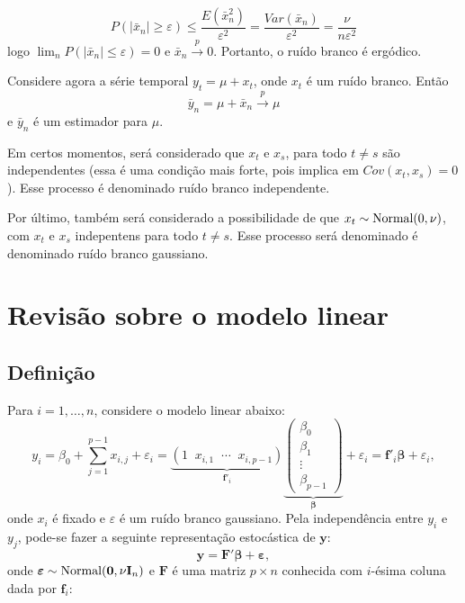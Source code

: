 \documentclass[
  letterpaper,
  DIV=11,
  numbers=noendperiod]{scrreprt}
\theoremstyle{definition}
\theoremstyle{plain}
\theoremstyle{definition}
\theoremstyle{plain}
\theoremstyle{remark}
\begin{document}
\[P\left(|\bar{x}_n|\geq\varepsilon\right)\leq \frac{E(\bar{x}_n^2)}{\varepsilon^2}=\frac{Var(\bar{x}_n)}{\varepsilon^2}=\frac{\nu}{n\varepsilon^2}\]
logo \(\lim_{n}P(|\bar{x}_n|\leq \varepsilon)=0\) e
\(\bar{x}_n\stackrel{p}{\rightarrow}0\). Portanto, o ruído branco é
ergódico.

Considere agora a série temporal \(y_t=\mu+x_t\), onde \(x_t\) é um
ruído branco. Então
\[\bar{y}_n=\mu+\bar{x}_n\stackrel{p}{\rightarrow}\mu\] e \(\bar{y}_n\)
é um estimador para \(\mu\).

Em certos momentos, será considerado que \(x_t\) e \(x_s\), para todo
\(t\neq s\) são independentes (essa é uma condição mais forte, pois
implica em \(Cov(x_t,x_s)=0\)). Esse processo é denominado ruído branco
independente.

Por último, também será considerado a possibilidade de que
\(x_t\sim\hbox{Normal}(0,\nu)\), com \(x_t\) e \(x_s\) indepentens para
todo \(t\neq s\). Esse processo será denominado é denominado ruído
branco gaussiano.


\hypertarget{revisuxe3o-sobre-o-modelo-linear}{%
\chapter{Revisão sobre o modelo
linear}\label{revisuxe3o-sobre-o-modelo-linear}}

\hypertarget{definiuxe7uxe3o}{%
\section{Definição}\label{definiuxe7uxe3o}}

Para \(i=1,\ldots,n\), considere o modelo linear abaixo:
\[y_i= \beta_0+\sum_{j=1}^{p-1}x_{i,j}+\varepsilon_i=\underbrace{ \left(1\;\;x_{i,1}\;\;\cdots\;\;x_{i,p-1}\right)}_\text{$\boldsymbol{f}'_i$}\underbrace{\left(\begin{array}{c}\beta_0 \\ \beta_1 \\ \vdots \\ \beta_{p-1} 
        \end{array}\right)}_\text{$\boldsymbol{\beta}$}+\varepsilon_i=\boldsymbol{f}'_i\boldsymbol{\beta}+\varepsilon_i,\]
onde \(x_i\) é fixado e \(\varepsilon\) é um ruído branco gaussiano.
Pela independência entre \(y_i\) e \(y_j\), pode-se fazer a seguinte
representação estocástica de \(\boldsymbol{y}\): \[\begin{equation}
        \boldsymbol{y}=\boldsymbol{F}'\boldsymbol{\beta} + \boldsymbol{\varepsilon},
        \end{equation}\] onde
\(\boldsymbol{\varepsilon}\sim\hbox{Normal}(\boldsymbol{0},\nu\textbf{I}_n)\)
e \(\boldsymbol{F}\) é uma matriz \(p\times n\) conhecida com
\(i\)-ésima coluna dada por \(\boldsymbol{f}_i\):
\end{document}
